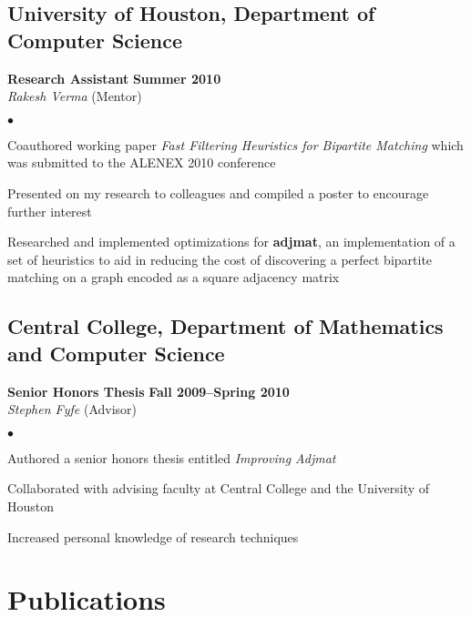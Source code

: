 \documentclass[10pt,letterpaper]{article}
\renewenvironment{itemize}{
  \begin{list}{}{
      \setlength{\leftmargin}{1.5em}
      \setlength{\itemsep}{0.25em}
      \setlength{\parskip}{0pt}
      \setlength{\parsep}{0.25em}
    }
  }{
  \end{list}
}
\newenvironment{bitemize}{
  \begin{list}{$\bullet$}{
      \setlength{\leftmargin}{1.5em}
      \setlength{\itemsep}{0.25em}
      \setlength{\parskip}{0pt}
      \setlength{\parsep}{0.25em}
    }
  }{
  \end{list}
}
\begin{document}
\subsection*{University of Houston, Department of Computer Science}

\begin{itemize}
\item \textbf{Research Assistant} \hfill \textbf{Summer 2010}\\
  \textit{Rakesh Verma} (Mentor)
  \begin{bitemize}
  \item Coauthored working paper \textit{Fast Filtering Heuristics for
      Bipartite Matching} which was submitted to the ALENEX 2010
    conference
  \item Presented on my research to colleagues and compiled a poster
    to encourage further interest
  \item Researched and implemented optimizations for
    \textbf{adjmat}, an implementation of a set of heuristics to aid
    in reducing the cost of discovering a perfect bipartite matching
    on a graph encoded as a square adjacency matrix
  \end{bitemize}
\end{itemize}

\subsection*{Central College, Department of Mathematics and
  Computer Science}

\begin{itemize}
\item \textbf{Senior Honors Thesis} \hfill \textbf{Fall
    2009--Spring 2010}\\
  \textit{Stephen Fyfe} (Advisor)
  \begin{bitemize}
  \item Authored a senior honors thesis entitled \textit{Improving Adjmat}
  \item Collaborated with advising faculty at Central College and the
    University of Houston
  \item Increased personal knowledge of research techniques
  \end{bitemize}
\end{itemize}

\pagebreak

\section*{Publications}
\end{document}
